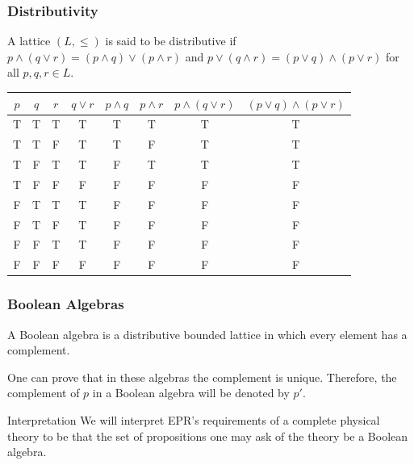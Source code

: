 \documentclass{beamer}
\begin{document}
\begin{frame}

	\frametitle{Distributivity}

	\begin{definition}
	
		A lattice $(L,\leq)$ is said to be distributive if $p\wedge(q\vee r)=(p\wedge q)\vee(p\wedge r)$ and $p\vee (q\wedge r)=(p\vee q)\wedge (p\vee r)$ for all $p,q,r\in L$.	
	
	\end{definition}
	
	\center
	\begin{tabular}{|c|c|c|c|c|c|c|c|}
	\hline
	$p$ & $q$ & $r$ & $q\vee r$ & $p\wedge q$ & $p\wedge r$ & $p\wedge(q\vee r)$ & $(p\vee q)\wedge(p\vee r)$ \\
	\hline
	T & T & T & T & T & T & T & T \\
	T & T & F & T & T & F & T & T \\
	T & F & T & T & F & T & T & T \\
	T & F & F & F & F & F & F & F \\
	F & T & T & T & F & F & F & F \\
	F & T & F & T & F & F & F & F \\
	F & F & T & T & F & F & F & F \\
	F & F & F & F & F & F & F & F \\
	\hline
	\end{tabular}

\end{frame}

\begin{frame}

	\frametitle{Boolean Algebras}
	
	\begin{definition}
	
		A Boolean algebra is a distributive bounded lattice in which every element has a complement.	
	
	\end{definition}

	One can prove that in these algebras the complement is unique. Therefore, the complement of $p$ in a Boolean algebra will be denoted by $p'$.

	\begin{alertblock}{Interpretation}
		We will interpret EPR's requirements of a complete physical theory to be that the set of propositions one may ask of the theory be a Boolean algebra.
	\end{alertblock}

\end{frame}
\end{document}
